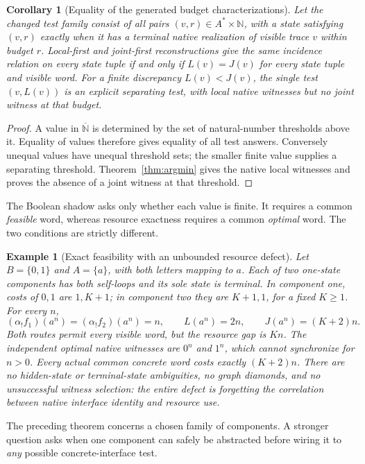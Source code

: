 \documentclass[11pt]{article}
\newtheorem{corollary}[theorem]{Corollary}
\newtheorem{example}[theorem]{Example}
\newcommand{\NN}{\mathbb N}
\newcommand{\Cost}{\overline{\mathbb N}}
\begin{document}
\begin{corollary}[Equality of the generated budget characterizations]
Let the changed test family consist of all pairs $(v,r)\in A^*\times\NN$, with a state satisfying $(v,r)$ exactly when it has a terminal native realization of visible trace $v$ within budget $r$. Local-first and joint-first reconstructions give the same incidence relation on every state tuple if and only if $L(v)=J(v)$ for every state tuple and visible word. For a finite discrepancy $L(v)<J(v)$, the single test $(v,L(v))$ is an explicit separating test, with local native witnesses but no joint witness at that budget.
\end{corollary}
\begin{proof}
A value in $\Cost$ is determined by the set of natural-number thresholds above it. Equality of values therefore gives equality of all test answers. Conversely unequal values have unequal threshold sets; the smaller finite value supplies a separating threshold. Theorem~\ref{thm:argmin} gives the native local witnesses and proves the absence of a joint witness at that threshold.
\end{proof}

The Boolean shadow asks only whether each value is finite. It requires a common \emph{feasible} word, whereas resource exactness requires a common \emph{optimal} word. The two conditions are strictly different.

\begin{example}[Exact feasibility with an unbounded resource defect]\label{ex:gap}
Let $B=\{0,1\}$ and $A=\{a\}$, with both letters mapping to $a$. Each of two one-state components has both self-loops and its sole state is terminal. In component one, costs of $0,1$ are $1,K+1$; in component two they are $K+1,1$, for a fixed $K\geq1$. For every $n$,
\[
 (\alpha_!f_1)(a^n)=(\alpha_!f_2)(a^n)=n,
 \qquad L(a^n)=2n,\qquad J(a^n)=(K+2)n.
\]
Both routes permit every visible word, but the resource gap is $Kn$. The independent optimal native witnesses are $0^n$ and $1^n$, which cannot synchronize for $n>0$. Every actual common concrete word costs exactly $(K+2)n$. There are no hidden-state or terminal-state ambiguities, no graph diamonds, and no unsuccessful witness selection: the entire defect is forgetting the correlation between native interface identity and resource use.
\end{example}

The preceding theorem concerns a chosen family of components. A stronger question asks when one component can safely be abstracted before wiring it to \emph{any} possible concrete-interface test.
\end{document}
